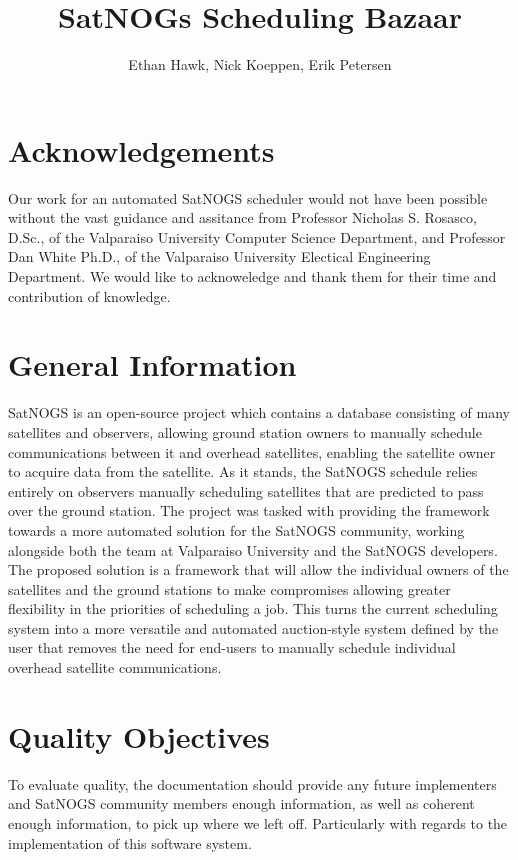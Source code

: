 \documentclass{article}
\author{Ethan Hawk, Nick Koeppen, Erik Petersen}
\title{SatNOGs Scheduling Bazaar}
\begin{document}
\maketitle
\tableofcontents

\section{Acknowledgements}

Our work for an automated SatNOGS scheduler would not have been possible without the vast guidance and assitance from Professor Nicholas S. Rosasco, D.Sc., of the Valparaiso University Computer Science Department, and Professor Dan White Ph.D., of the Valparaiso University Electical Engineering Department. We would like to acknoweledge and thank them for their time and contribution of knowledge.


\section{General Information}

SatNOGS is an open-source project which contains a database consisting of many
satellites and observers, allowing ground station owners to manually schedule
communications between it and overhead satellites, enabling the satellite owner
to acquire data from the satellite. As it stands, the SatNOGS schedule relies
entirely on observers manually scheduling satellites that are predicted to pass
over the ground station. The project was tasked with providing the framework
towards a more automated solution for the SatNOGS community, working alongside
both the team at Valparaiso University and the SatNOGS developers. The proposed
solution is a framework that will allow the individual owners of the satellites
and the ground stations to make compromises allowing greater flexibility in the
priorities of scheduling a job. This turns the current scheduling system into a
more versatile and automated auction-style system defined by the user that
removes the need for end-users to manually schedule individual overhead
satellite communications.

\section{Quality Objectives}

To evaluate quality, the documentation should provide any future implementers
and SatNOGS community members enough information, as well as coherent enough
information, to pick up where we left off. Particularly with regards to the
implementation of this software system.
\end{document}
